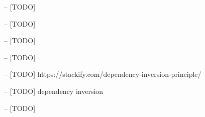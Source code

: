 \begin{thebibliography}{99999}
\singlespace\normalsize

 -- [TODO]

 -- [TODO]

 -- [TODO]

 -- [TODO]

 -- [TODO] https://stackify.com/dependency-inversion-principle/

 -- [TODO] dependency inversion

 -- [TODO] %














\end{thebibliography}
